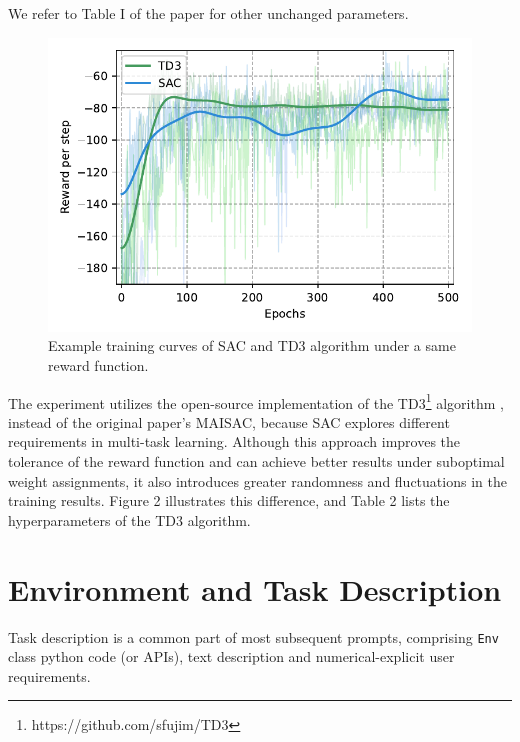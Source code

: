 \documentclass{article}
\begin{document}
We refer to Table I of the paper \cite{1} for other unchanged parameters.

\begin{figure}[!htb]
        \centering
        \includegraphics[width=0.502\linewidth]{TD3_SAC.pdf}
        \caption{Example training curves of SAC and TD3 algorithm under a same reward function.}
        \label{fig_1}
        \end{figure}


The experiment utilizes the open-source implementation of the TD3\footnote{https://github.com/sfujim/TD3} algorithm \cite{2}, instead of the original paper's MAISAC, because SAC \cite{3} explores different requirements in multi-task learning. Although this approach improves the tolerance of the reward function and can achieve better results under suboptimal weight assignments, it also introduces greater randomness and fluctuations in the training results. Figure 2 illustrates this difference, and Table 2 lists the hyperparameters of the TD3 algorithm.






\section{Environment and Task Description} 

Task description is a common part of most subsequent prompts, comprising \verb|Env| class python code (or APIs), text description and numerical-explicit user requirements. 
 
\end{document}
